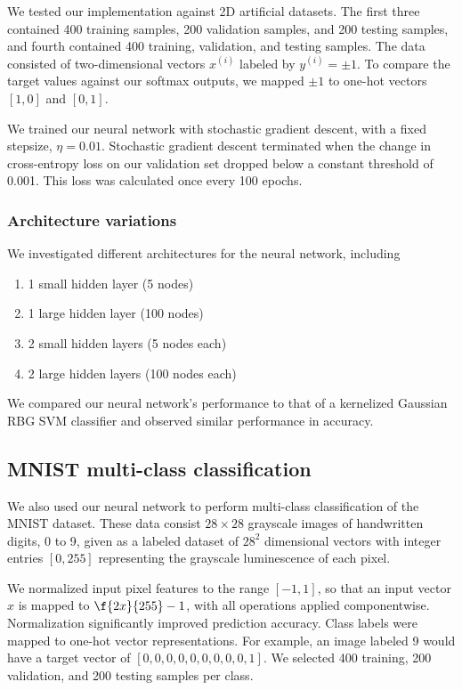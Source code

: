 \documentclass{article}
\newcommand{\sind}[1]{^{(#1)}}
\begin{document}
\begin{multicols}{2}
We tested our implementation against 2D artificial datasets.
The first three contained 400 training samples,
200 validation samples,
and 200 testing samples, and fourth contained 
400 training, validation, and testing samples.
The data consisted of two-dimensional vectors $x\sind{i}$ labeled by $y\sind{i} = \pm1$.
To compare the target values against our softmax outputs, we mapped $\pm1$ to
one-hot vectors $[1,0]$ and $[0,1]$.

We trained our neural network with stochastic gradient descent, with a 
fixed stepsize, $\eta = 0.01$. Stochastic gradient descent terminated when
the change in cross-entropy loss on our validation set dropped below a constant threshold of 0.001.
This loss was calculated once every 100 epochs.


\subsubsection{Architecture variations}
\label{subsubsec:binaryarch}
We investigated different architectures for the neural network, including
\begin{enumerate}
    \item 1 small hidden layer (5 nodes)
    \item 1 large hidden layer (100 nodes)
    \item 2 small hidden layers (5 nodes each)
    \item 2 large hidden layers (100 nodes each)
\end{enumerate}

We compared our neural network's performance to that of a kernelized
Gaussian RBG SVM classifier and observed similar performance in accuracy.

\subsection{MNIST multi-class classification}

We also used our neural network to perform multi-class classification of the
MNIST dataset. These data consist $28\times 28$ grayscale images of handwritten
digits, 0 to 9, given as a labeled dataset of $28^2$ dimensional vectors
with integer entries $[0,255]$ representing the grayscale luminescence of each pixel.

We normalized input pixel features to the range $[-1, 1]$,
so that an input vector $x$ is mapped to $\f{2x}{255}-1$,
with all operations applied componentwise.
Normalization significantly improved prediction accuracy.
Class labels were mapped to one-hot vector representations.
For example, an image labeled 9 would have a 
target vector of $[0,0,0,0,0,0,0,0,0,1]$.
We selected 400 training, 200 validation, and 200 testing samples per class.


\end{multicols}
\end{document}
